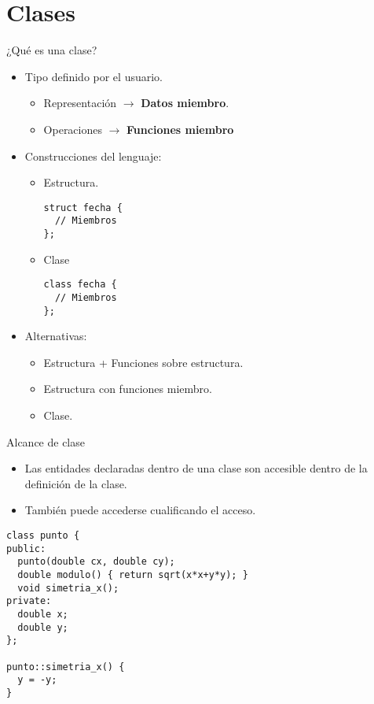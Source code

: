 \section{Clases}

\begin{frame}[fragile]{¿Qué es una clase?}
\begin{itemize}
  \item Tipo definido por el usuario.
    \begin{itemize}
      \item \alert{Representación} $\rightarrow$ \textbf{Datos miembro}.
      \item \alert{Operaciones} $\rightarrow$ \textbf{Funciones miembro}
    \end{itemize}
  \item Construcciones del lenguaje:
    \begin{itemize}
      \item Estructura.
\begin{lstlisting}
struct fecha {
  // Miembros
};
\end{lstlisting}
      \item Clase
\begin{lstlisting}
class fecha {
  // Miembros
};
\end{lstlisting}
    \end{itemize}
  \item Alternativas:
    \begin{itemize}
      \item Estructura + Funciones sobre estructura.
      \item Estructura con funciones miembro.
      \item Clase.    
    \end{itemize}
\end{itemize}
\end{frame}

\begin{frame}[t,fragile]{Alcance de clase}
\begin{itemize}
  \item Las entidades declaradas dentro de una clase son accesible dentro de la definición de la clase.
  \item También puede accederse cualificando el acceso.
\end{itemize}
\begin{lstlisting}
class punto {
public:
  punto(double cx, double cy);
  double modulo() { return sqrt(x*x+y*y); }
  void simetria_x();
private:
  double x;
  double y;
};

punto::simetria_x() {
  y = -y;
}

\end{lstlisting}
\end{frame}


